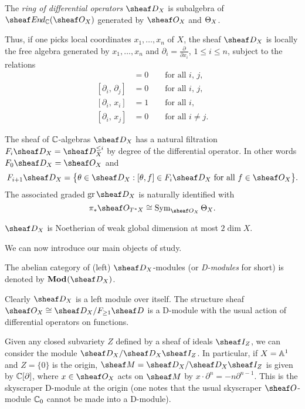 \documentclass[number-in-sections,a4paper]{notes}
\begin{document}
\begin{Definition}
    The \emph{ring of differential operators} $\sD_X$ is subalgebra of $\sheafEnd_\CC(\sO_X)$ generated by $\sO_X$ and $\Theta_{X}$.
\end{Definition}

Thus, if one picks local coordinates $x_1,\dotsc,x_n$ of $X$, the sheaf $\sD_X$ is locally the free algebra generated by $x_1,\dotsc,x_n$ and $\partial_i = \frac{\partial}{\partial x_i}$, $1 \le i \le n$, subject to the relations
\begin{align*}
    [x_i,\, x_j] &= 0 \qquad  \text{for all $i$, $j$},\\
    [\partial_i,\, \partial_j] &= 0 \qquad \text{for all $i$, $j$},\\
    [\partial_i,\, x_i] &= 1 \qquad \text{for all $i$},\\
    [\partial_i,\, x_j] &= 0 \qquad \text{for all $i \ne j$}.
\end{align*}

The sheaf of ${\mathbb{C}}$-algebras $\sD_X$ has a natural filtration $F_i\sD_X = \sD_X^{\le i}$ by degree of the differential operator.
In other words $F_0\sD_X = \sO_X$ and
\[
    F_{i+1}\sD_X = \bigl\{ \theta \in \sD_X : [\theta, f] \in F_i \sD_X \text{ for all $f \in \sO_X$} \bigr\}.
\]
The associated graded $\gr \sD_X$ is naturally identified with
\[
    \pi_*\sO_{T^*X} \cong \SymAlg_{\sO_X} \tb X.
\]

\begin{Corollary}
    $\sD_X$ is Noetherian of weak global dimension at most $2\dim X$.
\end{Corollary}

We can now introduce our main objects of study.

\begin{Definition}
    The abelian category of (left) $\sD_X$-modules (or \emph{D-modules} for short) is denoted by $\catDMod{X}$.
\end{Definition}

\begin{Examples}
    Clearly $\sD_X$ is a left module over itself.
    The structure sheaf $\sO_X \cong \sD_X / F_{\ge 1}\sD$ is a D-module with the usual action of differential operators on functions.

    Given any closed subvariety $Z$ defined by a sheaf of ideals $\sheaf I_Z$, we can consider the module $\sD_X/\sD_X\sheaf I_Z$.
    In particular, if $X = \mathbb A^{1}_{}$ and $Z = \{0\}$ is the origin, $\sheaf M = \sheaf D_X/\sheaf D_X\sheaf I_Z$ is given by ${\mathbb{C}}[\partial]$, where $x \in \sO_X$ acts on $\sheaf M$ by $x \cdot \partial^n = -n\partial^{n-1}$.
    This is the skyscraper D-module at the origin (one notes that the usual skyscraper $\sO$-module ${\mathbb{C}}_0$ cannot be made into a D-module).
\end{Examples}
\end{document}
